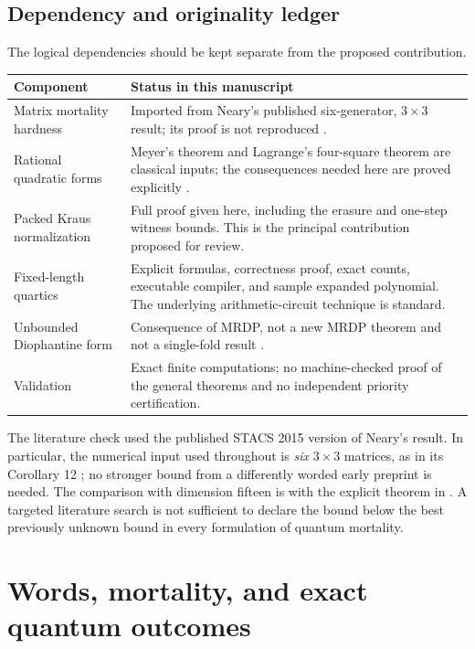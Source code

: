 \documentclass[11pt,letterpaper]{article}
\numberwithin{equation}{section}
\theoremstyle{definition}
\theoremstyle{remark}
\begin{document}
\subsection{Dependency and originality ledger}

The logical dependencies should be kept separate from the proposed contribution.

\begin{center}
\begin{tabular}{@{}p{}p{}@{}}
\toprule
Component & Status in this manuscript \\
\midrule
Matrix mortality hardness & Imported from Neary's published six-generator, $3\times3$ result; its proof is not reproduced \cite{neary}. \\
Rational quadratic forms & Meyer's theorem and Lagrange's four-square theorem are classical inputs; the consequences needed here are proved explicitly \cite{serre}. \\
Packed Kraus normalization & Full proof given here, including the erasure and one-step witness bounds. This is the principal contribution proposed for review. \\
Fixed-length quartics & Explicit formulas, correctness proof, exact counts, executable compiler, and sample expanded polynomial. The underlying arithmetic-circuit technique is standard. \\
Unbounded Diophantine form & Consequence of MRDP, not a new MRDP theorem and not a single-fold result \cite{proveit-mrdp-guide,matiyasevich-book}. \\
Validation & Exact finite computations; no machine-checked proof of the general theorems and no independent priority certification. \\
\bottomrule
\end{tabular}
\end{center}

The literature check used the published STACS 2015 version of Neary's result. In particular, the numerical input used throughout is \emph{six} $3\times3$ matrices, as in its Corollary 12 \cite{neary}; no stronger bound from a differently worded early preprint is needed. The comparison with dimension fifteen is with the explicit theorem in \cite{emg}. A targeted literature search is not sufficient to declare the bound below the best previously unknown bound in every formulation of quantum mortality.

\section{Words, mortality, and exact quantum outcomes}
\label{pqc:qm:sec:prelim}
\end{document}
